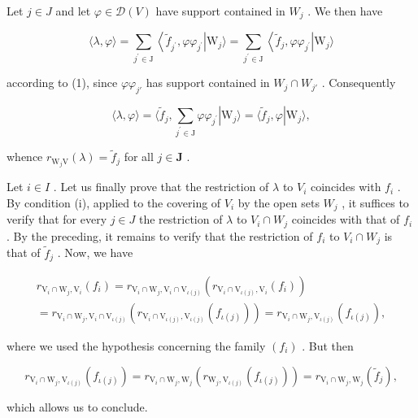 Let \(j \in J\) and let \(\varphi \in \mathcal{D}(V)\) have support contained in \(W_{j}\) . We then have

\[
\langle \lambda , \varphi \rangle = \sum_ {j ^ {\prime} \in \mathrm{J}} \left\langle \widetilde {f} _ {j ^ {\prime}}, \varphi \varphi_ {j ^ {\prime}} \right| \mathrm{W} _ {j} \rangle = \sum_ {j ^ {\prime} \in \mathrm{J}} \left\langle \widetilde {f} _ {j}, \varphi \varphi_ {j ^ {\prime}} \right| \mathrm{W} _ {j} \rangle
\]

according to (1), since \(\varphi\varphi_{j'}\) has support contained in \(W_j \cap W_{j'}\) . Consequently

\[
\langle \lambda , \varphi \rangle = \langle \widetilde {f} _ {j}, \sum_ {j ^ {\prime} \in \mathrm{J}} \varphi \varphi_ {j ^ {\prime}} | \mathrm{W} _ {j} \rangle = \langle \widetilde {f} _ {j}, \varphi | \mathrm{W} _ {j} \rangle ,
\]

whence \(r_{\mathrm{W}_j\mathrm{V}}(\lambda) = \widetilde{f}_j\) for all \(j\in \mathbf{J}\) .

Let \(i \in I\) . Let us finally prove that the restriction of \(\lambda\) to \(V_i\) coincides with \(f_i\) . By condition (i), applied to the covering of \(V_i\) by the open sets \(W_j\) , it suffices to verify that for every \(j \in J\) the restriction of \(\lambda\) to \(V_i \cap W_j\) coincides with that of \(f_i\) . By the preceding, it remains to verify that the restriction of \(f_i\) to \(V_i \cap W_j\) is that of \(\widetilde{f}_j\) . Now, we have

\[
\begin{array}{c} r _ {\mathrm{V} _ {i} \cap \mathrm{W} _ {j}, \mathrm{V} _ {i}} (f _ {i}) = r _ {\mathrm{V} _ {i} \cap \mathrm{W} _ {j}, \mathrm{V} _ {i} \cap \mathrm{V} _ {\iota (j)}} (r _ {\mathrm{V} _ {i} \cap \mathrm{V} _ {\iota (j)}, \mathrm{V} _ {i}} (f _ {i})) \\ = r _ {\mathrm{V} _ {i} \cap \mathrm{W} _ {j}, \mathrm{V} _ {i} \cap \mathrm{V} _ {\iota (j)}} (r _ {\mathrm{V} _ {i} \cap \mathrm{V} _ {\iota (j)}, \mathrm{V} _ {\iota (j)}} (f _ {\iota (j)})) = r _ {\mathrm{V} _ {i} \cap \mathrm{W} _ {j}, \mathrm{V} _ {\iota (j)}} (f _ {\iota (j)}), \end{array}
\]

where we used the hypothesis concerning the family \((f_{i})\) . But then

\[
r _ {\mathrm{V} _ {i} \cap \mathrm{W} _ {j}, \mathrm{V} _ {\iota (j)}} (f _ {\iota (j)}) = r _ {\mathrm{V} _ {i} \cap \mathrm{W} _ {j}, \mathrm{W} _ {j}} (r _ {\mathrm{W} _ {j}, \mathrm{V} _ {\iota (j)}} (f _ {\iota (j)})) = r _ {\mathrm{V} _ {i} \cap \mathrm{W} _ {j}, \mathrm{W} _ {j}} (\widetilde {f} _ {j}),
\]

which allows us to conclude.

